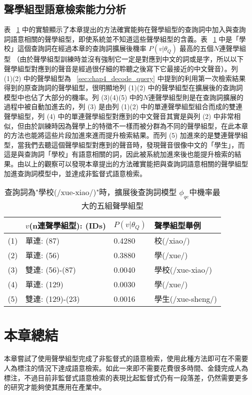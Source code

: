 \subsection{聲學組型語意檢索能力分析}
表 ~\ref{table:chap4_spa} 中的實驗顯示了本章提出的方法確實能夠在聲學組型的查詢詞中加入與查詢詞語意相關的聲學組型，即使系統並不知道這些聲學組型的含義。表 ~\ref{table:chap4_spa} 中是「學校」這個查詢詞在經過本章的查詢詞擴展後機率 $P(v|\theta_Q)$ 最高的五個$N$連聲學組型 （由於聲學組型訓練時並沒有強制它一定是對應到中文的詞或是字，所以以下聲學組型對應到的聲音是經過很仔細的聆聽之後寫下它最接近的中文聲音）。列 (1)(2) 中的聲學組型為 ~\ref{sec:chap4_decode_query}
中提到的利用第一次檢索結果得到的原查詢詞的聲學組型，很明顯地列 (1)(2) 中的聲學組型在擴展後的查詢詞模型中也佔了大部分的機率。列 (3)(4)(5) 中的$N$連聲學組型則是在查詢詞擴展的過程中被自動加進去的，列 (3) 是由列 (1)(2) 中的單連聲學組型組合而成的雙連聲學組型，列 (4) 中的單連聲學組型對應到的中文聲音其實是與列 (2)
中非常相似，但由於訓練時因為聲學上的特徵不一樣而被分群為不同的聲學組型，在此本章的方法也能將這些片段加進來進而提升檢索結果。而列 (5) 加進來的是雙連聲學組型，當我們去聽這個聲學組型對應到的聲音時，發現聲音很像中文的「學生」，而這是與查詢詞「學校」有語意相關的詞，因此被系統加進來後也能提升檢索的結果。由以上的觀察可以發現本章提出的方法確實能把與查詢詞語意相關的聲學組型加進查詢詞模型中，並達成非監督式語意檢索。

\begin{table}[htbp]
\centering
\begin{tabular}{llll}
\hline
& $v$(n連聲學組型): (IDs) & $P(v|\theta_Q)$ & 聲學組型舉例 \\
\hline 
(1) & 單連: (87) & 0.4280 & 校(/xiao/) \\
(2) & 單連: (56) & 0.3880 & 學(/xue/) \\
(3) & 雙連: (56)-(87) & 0.0040 & 學校(/xue-xiao/) \\
(4) & 單連: (129) & 0.0030 & 學(/xue/) \\ 
(5) & 雙連: (129)-(23) & 0.0016 & 學生(/xue-sheng/) \\
\end{tabular}
\caption{查詢詞為"學校(/xue-xiao/)"時，擴展後查詢詞模型 $\phi_{qe}$中機率最大的五組聲學組型}
\label{table:chap4_spa}
\end{table}

\section{本章總結}
本章嘗試了使用聲學組型完成了非監督式的語意檢索，使用此種方法即可在不需要人為標注的情況下達成語意檢索。如此一來即不需要花費很多時間、金錢完成人為標注，不過目前非監督式語意檢索的表現比起監督式仍有一段落差，仍然需要更多的研究才能夠使其應用在產業中。
